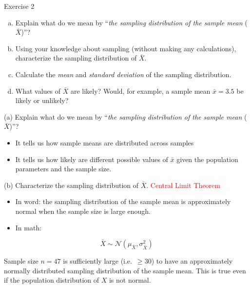 \documentclass[
  11pt,
  ignorenonframetext,
]{beamer}
\begin{document}
\begin{frame}{Exercise 2}
\protect\hypertarget{exercise-2-1}{}
\begin{enumerate}
[(a)]
\item
  Explain what do we mean by ``\emph{the sampling distribution of the
  sample mean} (\(\bar{X}\))''?
\item
  Using your knowledge about sampling (without making any calculations),
  characterize the sampling distribution of \(\bar{X}\).
\item
  Calculate the \emph{mean} and \emph{standard deviation} of the
  sampling distribution.
\item
  What values of \(\bar{X}\) are likely? Would, for example, a sample
  mean \(\bar{x} = 3.5\) be likely or unlikely?
\end{enumerate}
\end{frame}

\begin{frame}{(a) Explain what do we mean by ``\emph{the sampling
distribution of the sample mean} (\(\bar{X}\))''?}
\protect\hypertarget{a-explain-what-do-we-mean-by-the-sampling-distribution-of-the-sample-mean-barx}{}
\begin{itemize}
\item
  It tells us how sample means are distributed across samples
\item
  It tells us how likely are different possible values of \(\bar{x}\)
  given the population parameters and the sample size.
\end{itemize}
\end{frame}

\begin{frame}{(b) Characterize the sampling distribution of
\(\bar{X}\).}
\protect\hypertarget{b-characterize-the-sampling-distribution-of-barx.}{}
\textcolor{red}{Central Limit Theorem}

\begin{itemize}
\item
  In word: the sampling distribution of the sample mean is approximately
  normal when the sample size is large enough.
\item
  In math:
\end{itemize}

\[
  \bar{X} \sim \mathcal{N}\left(\mu_{\bar X},\sigma^2_{\bar X}\right)
  \]

Sample size \(n = 47\) is sufficiently large (i.e.~\(\geq 30\)) to have
an approximately normally distributed sampling distribution of the
sample mean. This is true even if the population distribution of \(X\)
is not normal.
\end{frame}
\end{document}
